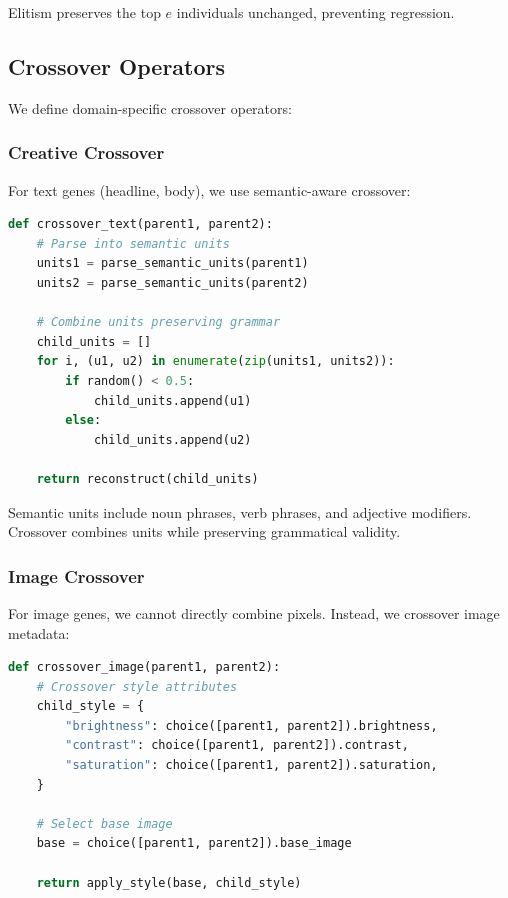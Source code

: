 Elitism preserves the top $e$ individuals unchanged, preventing regression.

\subsection{Crossover Operators}

We define domain-specific crossover operators:

\subsubsection{Creative Crossover}

For text genes (headline, body), we use semantic-aware crossover:

\begin{lstlisting}[language=Python,caption=Semantic text crossover]
def crossover_text(parent1, parent2):
    # Parse into semantic units
    units1 = parse_semantic_units(parent1)
    units2 = parse_semantic_units(parent2)

    # Combine units preserving grammar
    child_units = []
    for i, (u1, u2) in enumerate(zip(units1, units2)):
        if random() < 0.5:
            child_units.append(u1)
        else:
            child_units.append(u2)

    return reconstruct(child_units)
\end{lstlisting}

Semantic units include noun phrases, verb phrases, and adjective modifiers. Crossover combines units while preserving grammatical validity.

\subsubsection{Image Crossover}

For image genes, we cannot directly combine pixels. Instead, we crossover image metadata:

\begin{lstlisting}[language=Python,caption=Image metadata crossover]
def crossover_image(parent1, parent2):
    # Crossover style attributes
    child_style = {
        "brightness": choice([parent1, parent2]).brightness,
        "contrast": choice([parent1, parent2]).contrast,
        "saturation": choice([parent1, parent2]).saturation,
    }

    # Select base image
    base = choice([parent1, parent2]).base_image

    return apply_style(base, child_style)
\end{lstlisting}

